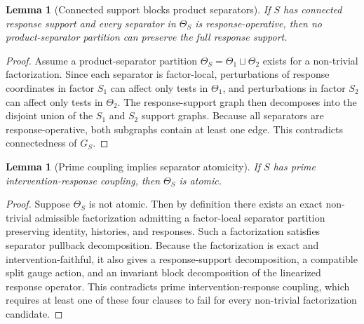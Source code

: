 \documentclass[11pt]{article}
\newtheorem{lemma}[definition]{Lemma}
\begin{document}
\begin{lemma}[Connected support blocks product separators]
If $S$ has connected response support and every separator in $\Theta_S$ is response-operative, then no product-separator partition can preserve the full response support.
\end{lemma}

\begin{proof}
Assume a product-separator partition $\Theta_S=\Theta_1\sqcup\Theta_2$ exists for a non-trivial factorization. Since each separator is factor-local, perturbations of response coordinates in factor $S_1$ can affect only tests in $\Theta_1$, and perturbations in factor $S_2$ can affect only tests in $\Theta_2$. The response-support graph then decomposes into the disjoint union of the $S_1$ and $S_2$ support graphs. Because all separators are response-operative, both subgraphs contain at least one edge. This contradicts connectedness of $G_S$.
\end{proof}

\begin{lemma}[Prime coupling implies separator atomicity]
If $S$ has prime intervention-response coupling, then $\Theta_S$ is atomic.
\end{lemma}

\begin{proof}
Suppose $\Theta_S$ is not atomic. Then by definition there exists an exact non-trivial admissible factorization admitting a factor-local separator partition preserving identity, histories, and responses. Such a factorization satisfies separator pullback decomposition. Because the factorization is exact and intervention-faithful, it also gives a response-support decomposition, a compatible split gauge action, and an invariant block decomposition of the linearized response operator. This contradicts prime intervention-response coupling, which requires at least one of these four clauses to fail for every non-trivial factorization candidate.
\end{proof}
\end{document}
